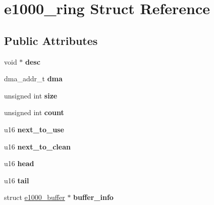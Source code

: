 \hypertarget{structe1000__ring}{
\section{e1000\_\-ring Struct Reference}
\label{structe1000__ring}
}
\subsection*{Public Attributes}
\begin{DoxyCompactItemize}
\item 
\hypertarget{structe1000__ring_a277ce8b1b78bdc82cc201e562f70a019}{
void $\ast$ {\bfseries desc}}
\label{structe1000__ring_a277ce8b1b78bdc82cc201e562f70a019}

\item 
\hypertarget{structe1000__ring_a2c4844a1c7136f4d2784f485b69f8a14}{
dma\_\-addr\_\-t {\bfseries dma}}
\label{structe1000__ring_a2c4844a1c7136f4d2784f485b69f8a14}

\item 
\hypertarget{structe1000__ring_a29ac5eec3373f1d7726e4a01e0e0f5e4}{
unsigned int {\bfseries size}}
\label{structe1000__ring_a29ac5eec3373f1d7726e4a01e0e0f5e4}

\item 
\hypertarget{structe1000__ring_a9213391394930d50334333a1f999a8c7}{
unsigned int {\bfseries count}}
\label{structe1000__ring_a9213391394930d50334333a1f999a8c7}

\item 
\hypertarget{structe1000__ring_a996a9aecadeb8be2d60443449f115c0a}{
u16 {\bfseries next\_\-to\_\-use}}
\label{structe1000__ring_a996a9aecadeb8be2d60443449f115c0a}

\item 
\hypertarget{structe1000__ring_a0050308c7b0692e2c2668cc264c033e9}{
u16 {\bfseries next\_\-to\_\-clean}}
\label{structe1000__ring_a0050308c7b0692e2c2668cc264c033e9}

\item 
\hypertarget{structe1000__ring_aae27dc7189943a90be6fa9e5f7ed7e64}{
u16 {\bfseries head}}
\label{structe1000__ring_aae27dc7189943a90be6fa9e5f7ed7e64}

\item 
\hypertarget{structe1000__ring_a89b1ca5db8d1b76dc389f1ca890d3a18}{
u16 {\bfseries tail}}
\label{structe1000__ring_a89b1ca5db8d1b76dc389f1ca890d3a18}

\item 
\hypertarget{structe1000__ring_a774de210a1863acd745143f281be894f}{
struct \hyperlink{structe1000__buffer}{e1000\_\-buffer} $\ast$ {\bfseries buffer\_\-info}}
\label{structe1000__ring_a774de210a1863acd745143f281be894f}


\end{DoxyCompactItemize}

